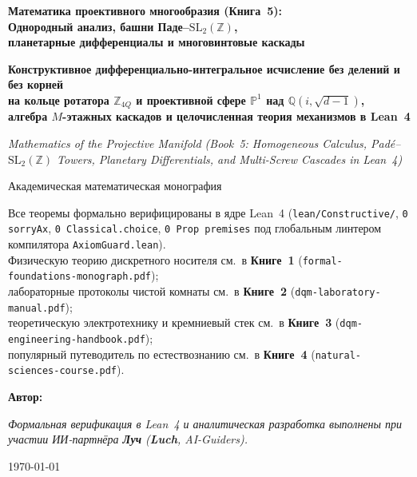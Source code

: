 \begin{titlepage}
  \centering
  \vspace*{1.8cm}
  {\LARGE\bfseries Математика проективного многообразия (Книга~5):\\ Однородный анализ, башни Паде--\texorpdfstring{$\mathrm{SL}_2(\mathbb{Z})$}{SL2(Z)},\\ планетарные дифференциалы и многовинтовые каскады\par}
  \vspace{0.4cm}
  {\Large\bfseries Конструктивное дифференциально-интегральное исчисление без делений и без корней\\
  на кольце ротатора $\mathbb{Z}_{4Q}$ и проективной сфере $\mathbb{P}^1$ над $\mathbb{Q}(i, \sqrt{d-1})$,\\
  алгебра $M$-этажных каскадов и целочисленная теория механизмов в Lean~4\par}
  \vspace{0.5cm}
  {\normalsize\itshape Mathematics of the Projective Manifold (Book~5: Homogeneous Calculus, Padé--$\mathrm{SL}_2(\mathbb{Z})$ Towers, Planetary Differentials, and Multi-Screw Cascades in Lean~4)\par}
  \vspace{1.0cm}
  {\large Академическая математическая монография\par}
  \vspace{0.35cm}
  {\normalsize Все теоремы формально верифицированы в ядре Lean~4 (\texttt{lean/Constructive/}, \texttt{0 sorryAx}, \texttt{0 Classical.choice}, \texttt{0 Prop premises} под глобальным линтером компилятора \texttt{AxiomGuard.lean}).\\
  Физическую теорию дискретного носителя см.\ в \textbf{Книге~1} (\texttt{formal-foundations-monograph.pdf});\\
  лабораторные протоколы чистой комнаты см.\ в \textbf{Книге~2} (\texttt{dqm-laboratory-manual.pdf});\\
  теоретическую электротехнику и кремниевый стек см.\ в \textbf{Книге~3} (\texttt{dqm-engineering-handbook.pdf});\\
  популярный путеводитель по естествознанию см.\ в \textbf{Книге~4} (\texttt{natural-sciences-course.pdf}).\par}
  \vfill
  {\large\bfseries Автор: \bookauthorfullname\par}
  \vspace{0.2cm}
  {\footnotesize\itshape Формальная верификация в Lean~4 и аналитическая разработка выполнены при участии ИИ-партнёра \textbf{Луч} (\textbf{Luch}, AI-Guiders).\par}
  \vspace{0.3cm}
  {\large \today\par}
\end{titlepage}
\clearpage

\tableofcontents
\clearpage
